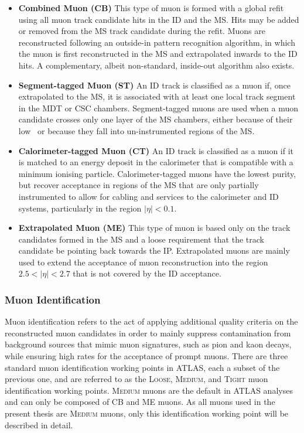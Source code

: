 \begin{itemize}
    \item{\textbf{Combined Muon (CB)}} This type of muon is formed with a global refit using all muon track candidate hits
        in the ID and the MS. Hits may be added or removed from the MS track candidate during the refit.
        Muons are reconstructed following an outside-in pattern recognition algorithm, in which the
        muon is first reconstructed in the MS and extrapolated inwards to the ID hits.
        A complementary, albeit non-standard, inside-out algorithm also exists.
    \item{\textbf{Segment-tagged Muon (ST)}} An ID track is classified as a muon if, once extrapolated to the MS,
        it is associated with at least one local track segment in the MDT or CSC chambers. Segment-tagged muons
        are used when a muon candidate crosses only one layer of the MS chambers, either because of their
        low \pT~or because they fall into un-instrumented regions of the MS.
    \item{\textbf{Calorimeter-tagged Muon (CT)}} An ID track is classified as a muon if it is matched to an
        energy deposit in the calorimeter that is compatible with a minimum ionising particle.
        Calorimeter-tagged muons have the lowest purity, but recover acceptance in regions of the MS
        that are only partially instrumented to allow for cabling and services to the calorimeter and ID systems,
        particularly in the region $\lvert \eta \rvert < 0.1$.
    \item{\textbf{Extrapolated Muon (ME)}} This type of muon is based only on the track candidates formed in the MS
        and a loose requirement that the track candidate be pointing back towards the IP.
        Extrapolated muons are mainly used to extend the acceptance of muon reconstruction into the region
        $2.5 < \lvert \eta \rvert < 2.7$ that is not covered by the ID acceptance.
\end{itemize}

\subsubsection{Muon Identification}
\label{sec:muon_id}

Muon identification refers to the act of applying additional quality criteria on
the reconstructed muon candidates in order to mainly suppress contamination from
background sources that mimic muon signatures, such as pion and kaon decays, 
while ensuring high rates for the acceptance of prompt muons.
There are three standard muon identification working points in ATLAS, each
a subset of the previous one, and are referred to as the \textsc{Loose},
\textsc{Medium}, and \textsc{Tight} muon identification working points.
\textsc{Medium} muons are the default in ATLAS analyses and can only be composed
of CB and ME muons.
As all muons used in the present thesis are \textsc{Medium} muons, only this
identification working point will be described in detail.

